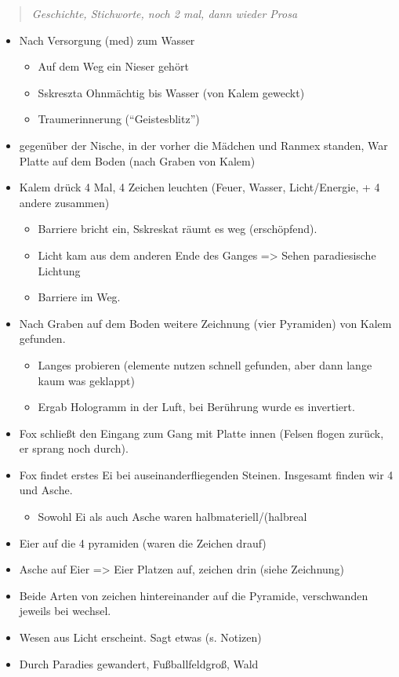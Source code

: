 \documentclass[11pt]{article}
\begin{document}
\begin{quote}
\emph{Geschichte, Stichworte, noch 2 mal, dann wieder Prosa}

\end{quote}
\begin{itemize}
\item
  Nach Versorgung (med) zum Wasser
  \begin{itemize}
  \item
    Auf dem Weg ein Nieser gehört
  \item
    Sskreszta Ohnmächtig bis Wasser (von Kalem geweckt)
  \item
    Traumerinnerung (``Geistesblitz'')
  \end{itemize}
\item
  gegenüber der Nische, in der vorher die Mädchen und Ranmex standen,
  War Platte auf dem Boden (nach Graben von Kalem)
\item
  Kalem drück 4 Mal, 4 Zeichen leuchten (Feuer, Wasser, Licht/Energie, +
  4 andere zusammen)

  \begin{itemize}
  \item
    Barriere bricht ein, Sskreskat räumt es weg (erschöpfend).
  \item
    Licht kam aus dem anderen Ende des Ganges =\textgreater{} Sehen
    paradiesische Lichtung
  \item
    Barriere im Weg.
  \end{itemize}
\item
  Nach Graben auf dem Boden weitere Zeichnung (vier Pyramiden) von Kalem
  gefunden.

  \begin{itemize}
  \item
    Langes probieren (elemente nutzen schnell gefunden, aber dann lange
    kaum was geklappt)
  \item
    Ergab Hologramm in der Luft, bei Berührung wurde es invertiert.
  \end{itemize}
\item
  Fox schließt den Eingang zum Gang mit Platte innen (Felsen flogen
  zurück, er sprang noch durch).
\item
  Fox findet erstes Ei bei auseinanderfliegenden Steinen. Insgesamt
  finden wir 4 und Asche.

  \begin{itemize}
  \item
    Sowohl Ei als auch Asche waren halbmateriell/(halbreal
  \end{itemize}
\item
  Eier auf die 4 pyramiden (waren die Zeichen drauf)
\item
  Asche auf Eier =\textgreater{} Eier Platzen auf, zeichen drin (siehe
  Zeichnung)
\item
  Beide Arten von zeichen hintereinander auf die Pyramide, verschwanden
  jeweils bei wechsel.
\item
  Wesen aus Licht erscheint. Sagt etwas (s. Notizen)
\item
  Durch Paradies gewandert, Fußballfeldgroß, Wald


\end{itemize}
\end{document}
